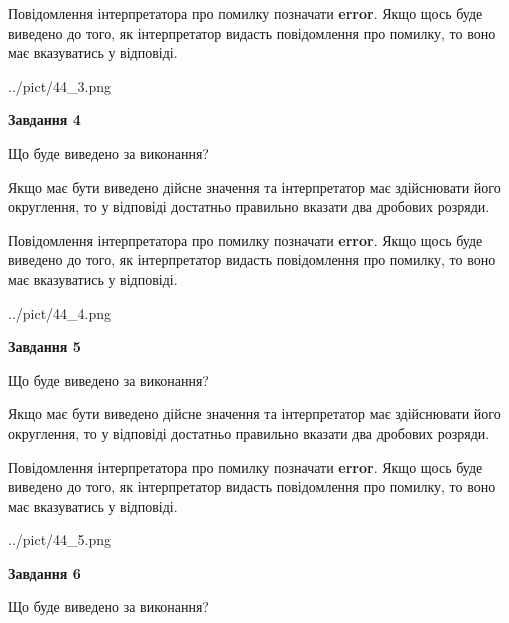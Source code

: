 \documentclass[12pt, ukrainian]{article}
\begin{document}
{\begin {Large}
Повідомлення інтерпретатора про помилку позначати \textbf{error}.
Якщо щось буде виведено до того, як інтерпретатор видасть повідомлення про помилку, 
то воно має вказуватись у відповіді. \par

\begin{center}
	{../pict/44_3.png}
\end{center}
\newpage

{\begin {center}\textbf{Завдання 4}\end {center}}\par
Що буде виведено за виконання? \par

Якщо має бути виведено дійсне значення та інтерпретатор має здійснювати його округлення, 
то у відповіді достатньо правильно вказати два дробових розряди.

Повідомлення інтерпретатора про помилку позначати \textbf{error}.
Якщо щось буде виведено до того, як інтерпретатор видасть повідомлення про помилку, 
то воно має вказуватись у відповіді. \par

\begin{center}
	{../pict/44_4.png}
\end{center}
\newpage

{\begin {center}\textbf{Завдання 5}\end {center}}\par
Що буде виведено за виконання? \par

Якщо має бути виведено дійсне значення та інтерпретатор має здійснювати його округлення, 
то у відповіді достатньо правильно вказати два дробових розряди.

Повідомлення інтерпретатора про помилку позначати \textbf{error}.
Якщо щось буде виведено до того, як інтерпретатор видасть повідомлення про помилку, 
то воно має вказуватись у відповіді. \par

\begin{center}
	{../pict/44_5.png}
\end{center}
\newpage

{\begin {center}\textbf{Завдання 6}\end {center}}\par
Що буде виведено за виконання? \par


\end{Large}}
\end{document}
